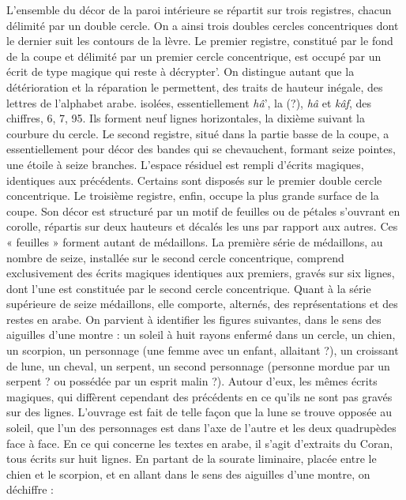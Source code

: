 L'ensemble du décor de la paroi intérieure se répartit sur trois registres, chacun délimité par un double cercle. On a ainsi trois doubles cercles concentriques dont le dernier suit les contours de la lèvre. 
Le premier registre, constitué par le fond de la coupe et délimité par un premier cercle concentrique, est occupé par un écrit de type magique qui reste à décrypter'. On distingue autant que la détérioration et la réparation le permettent, des traits de hauteur inégale, des lettres de l'alphabet arabe. isolées, essentiellement \textit{hâ}', la (?), \textit{hâ} et \textit{kâf}, des chiffres, 6, 7, 95. Ils forment neuf lignes horizontales, la dixième suivant la courbure du cercle. Le second registre, situé dans la partie basse de la coupe, a essentiellement pour décor des bandes qui se chevauchent, formant seize pointes, une étoile à seize branches. L'espace résiduel est rempli d'écrits magiques, identiques aux précédents. Certains sont disposés sur le premier double cercle concentrique. Le troisième registre, enfin, occupe la plus grande surface de la coupe. Son décor est structuré par un motif de feuilles ou de pétales s'ouvrant en corolle, répartis sur deux hauteurs et décalés les uns par rapport aux autres. Ces « feuilles » forment autant de médaillons. La première série de médaillons, au nombre de seize, installée sur le second cercle concentrique, comprend exclusivement des écrits magiques identiques aux premiers, gravés sur six lignes, dont l'une est constituée par le second cercle concentrique. Quant à la série supérieure de seize médaillons, elle comporte, alternés, des représentations et des restes en arabe. On parvient à identifier les figures suivantes, dans le sens des aiguilles d'une montre : un soleil à huit rayons enfermé dans un cercle, un chien, un scorpion, un personnage (une femme avec un enfant, allaitant ?), un croissant de lune, un cheval, un serpent, un second personnage (personne mordue par un serpent ? ou possédée par un esprit malin ?). Autour d'eux, les mêmes écrits magiques, qui diffèrent cependant des précédents en ce qu'ils ne sont pas gravés sur des lignes.
L'ouvrage est fait de telle façon que la lune se trouve opposée au soleil, que l'un des personnages est dans l'axe de l'autre et les deux quadrupèdes face à face. En ce qui concerne les textes en arabe, il s'agit d'extraits du Coran, tous écrits sur huit lignes. En partant de la sourate liminaire, placée entre le chien et le scorpion, et en allant dans le sens des aiguilles d'une montre, on déchiffre :
